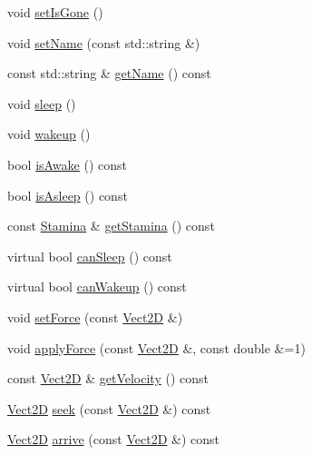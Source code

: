 \begin{DoxyCompactItemize}
\item 
void \hyperlink{classFish_ad7d3a39831fa4a170a63dde98474b728_ad7d3a39831fa4a170a63dde98474b728}{set\+Is\+Gone} ()
\item 
void \hyperlink{classFish_a27a489adca6d1dc91b011ee97f36ae75_a27a489adca6d1dc91b011ee97f36ae75}{set\+Name} (const std\+::string \&)
\item 
const std\+::string \& \hyperlink{classFish_a96583314997aab0826f1c595f7d58938_a96583314997aab0826f1c595f7d58938}{get\+Name} () const
\item 
void \hyperlink{classFish_acac2f4f6c31adfb0c8f4eb78853445bb_acac2f4f6c31adfb0c8f4eb78853445bb}{sleep} ()
\item 
void \hyperlink{classFish_a8160593a43c6ce5263c6280e0cf0a7be_a8160593a43c6ce5263c6280e0cf0a7be}{wakeup} ()
\item 
bool \hyperlink{classFish_aea2a66c3cd46d3a672c82ca9e537b9ec_aea2a66c3cd46d3a672c82ca9e537b9ec}{is\+Awake} () const
\item 
bool \hyperlink{classFish_a4772391eb9a92dca61b810b40705709b_a4772391eb9a92dca61b810b40705709b}{is\+Asleep} () const
\item 
const \hyperlink{classStamina}{Stamina} \& \hyperlink{classFish_a8637a567ecb17376bed45783d5ddb53d_a8637a567ecb17376bed45783d5ddb53d}{get\+Stamina} () const
\item 
virtual bool \hyperlink{classFish_a9a94edb09498e8d0d2381c2cc3e2e9dc_a9a94edb09498e8d0d2381c2cc3e2e9dc}{can\+Sleep} () const
\item 
virtual bool \hyperlink{classFish_a033298bf0dc885b82dbd195fc4997643_a033298bf0dc885b82dbd195fc4997643}{can\+Wakeup} () const
\item 
void \hyperlink{classVehicle_a03e22c522e6f526f95428c81d0762833_a03e22c522e6f526f95428c81d0762833}{set\+Force} (const \hyperlink{classVect2D}{Vect2D} \&)
\item 
void \hyperlink{classVehicle_a82fbbd5aafc1ba89c3daa4da09989bbe_a82fbbd5aafc1ba89c3daa4da09989bbe}{apply\+Force} (const \hyperlink{classVect2D}{Vect2D} \&, const double \&=1)
\item 
const \hyperlink{classVect2D}{Vect2D} \& \hyperlink{classVehicle_a87b8266cb3495e8444233a0724e1bf07_a87b8266cb3495e8444233a0724e1bf07}{get\+Velocity} () const
\item 
\hyperlink{classVect2D}{Vect2D} \hyperlink{classVehicle_a86c0b5ddcf64443bc090657cd29832bf_a86c0b5ddcf64443bc090657cd29832bf}{seek} (const \hyperlink{classVect2D}{Vect2D} \&) const
\item 
\hyperlink{classVect2D}{Vect2D} \hyperlink{classVehicle_a55f8bb6cfbdd97219c2cea6cf3ad3826_a55f8bb6cfbdd97219c2cea6cf3ad3826}{arrive} (const \hyperlink{classVect2D}{Vect2D} \&) const

\end{DoxyCompactItemize}
